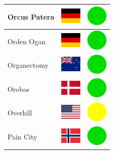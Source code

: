 \documentclass[12pt, a4paper, twoside]{report}
\begin{document}
\begin{center}
\begin{longtable}{|p{5cm}|p{2cm}|p{2cm}|}
Orcus Patera & \includegraphics[width=1cm]{4x3/de} & \includegraphics[width=1cm]{likes/y} \\ \hline
Orden Ogan & \includegraphics[width=1cm]{4x3/de} & \includegraphics[width=1cm]{likes/y} \\ \hline
Organectomy & \includegraphics[width=1cm]{4x3/nz} & \includegraphics[width=1cm]{likes/y} \\ \hline
Orobas & \includegraphics[width=1cm]{4x3/dk} & \includegraphics[width=1cm]{likes/y} \\ \hline
Overkill & \includegraphics[width=1cm]{4x3/us} & \includegraphics[width=1cm]{likes/m} \\ \hline
Pain City & \includegraphics[width=1cm]{4x3/no} & \includegraphics[width=1cm]{likes/y} \\ \hline

\end{longtable}
\end{center}
\end{document}

